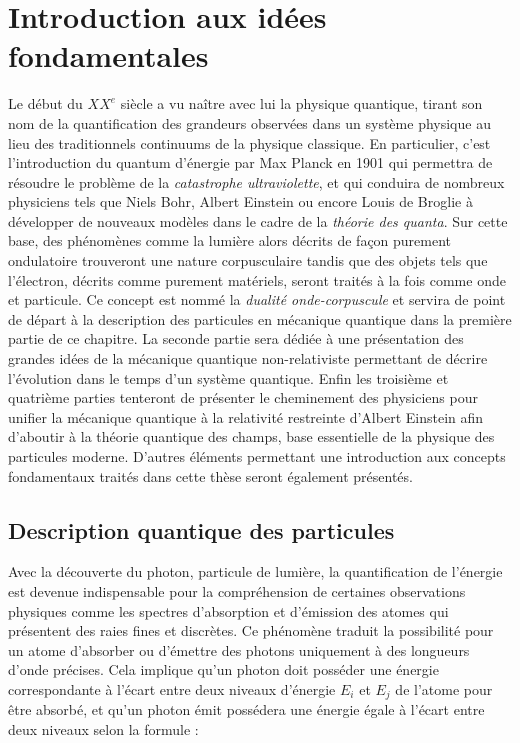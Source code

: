     \chapter{Introduction aux idées fondamentales}

                Le début du $XX^e$ siècle a vu naître avec lui la physique quantique, tirant son nom de la quantification des grandeurs observées dans un système physique au lieu des traditionnels continuums de la physique classique. En particulier, c'est l'introduction du quantum d'énergie par Max Planck en 1901 qui permettra de résoudre le problème de la \textit{catastrophe ultraviolette}, et qui conduira de nombreux physiciens tels que Niels Bohr, Albert Einstein ou encore Louis de Broglie à développer de nouveaux modèles dans le cadre de la \textit{théorie des quanta}. Sur cette base, des phénomènes comme la lumière alors décrits de façon purement ondulatoire trouveront une nature corpusculaire tandis que des objets tels que l'électron, décrits comme purement matériels, seront traités à la fois comme onde et particule. Ce concept est nommé la \textit{dualité onde-corpuscule} et servira de point de départ à la description des particules en mécanique quantique dans la première partie de ce chapitre. La seconde partie sera dédiée à une présentation des grandes idées de la mécanique quantique non-relativiste permettant de décrire l'évolution dans le temps d'un système quantique. Enfin les troisième et quatrième parties tenteront de présenter le cheminement des physiciens pour unifier la mécanique quantique à la relativité restreinte d'Albert Einstein \cite{Einstein1905} afin d'aboutir à la théorie quantique des champs, base essentielle de la physique des particules moderne. D'autres éléments permettant une introduction aux concepts fondamentaux traités dans cette thèse seront également présentés.
                
        \section{Description quantique des particules}
        
            Avec la découverte du photon, particule de lumière, la quantification de l'énergie est devenue indispensable pour la compréhension de certaines observations physiques comme les spectres d'absorption et d'émission des atomes qui présentent des raies fines et discrètes. Ce phénomène traduit la possibilité pour un atome d'absorber ou d'émettre des photons uniquement à des longueurs d'onde précises. Cela implique qu'un photon doit posséder une énergie correspondante à l'écart entre deux niveaux d'énergie $E_i$ et $E_j$ de l'atome pour être absorbé, et qu'un photon émit possédera une énergie égale à l'écart entre deux niveaux selon la formule : 
            
